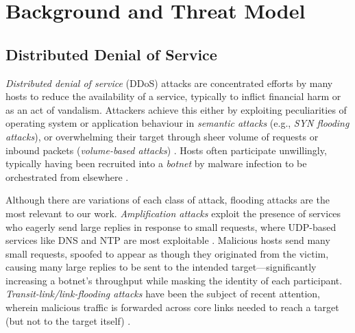 \documentclass[10pt, times, comsoc]{IEEEtran}
\begin{document}
\section{Background and Threat Model}

\subsection{Distributed Denial of Service}


\emph{Distributed denial of service} (DDoS) attacks are concentrated efforts by many hosts to reduce the availability of a service, typically to inflict financial harm or as an act of vandalism.
Attackers achieve this either by exploiting peculiarities of operating system or application behaviour in \emph{semantic attacks} (e.g., \emph{SYN flooding attacks}), or overwhelming their target through sheer volume of requests or inbound packets (\emph{volume-based attacks}) \cite{DBLP:conf/imc/JonkerKKRSD17}.
Hosts often participate unwillingly, typically having been recruited into a \emph{botnet} by malware infection to be orchestrated from elsewhere \cite{DBLP:conf/uss/AntonakakisABBB17}.

Although there are variations of each class of attack, flooding attacks are the most relevant to our work.
\emph{Amplification attacks} exploit the presence of services who eagerly send large replies in response to small requests, where UDP-based services like DNS and NTP are most exploitable \cite{DBLP:conf/ndss/Rossow14, DBLP:conf/uss/KuhrerHRH14}.
Malicious hosts send many small requests, spoofed to appear as though they originated from the victim, causing many large replies to be sent to the intended target---significantly increasing a botnet's throughput while masking the identity of each participant.
\emph{Transit-link/link-flooding attacks} have been the subject of recent attention, wherein malicious traffic is forwarded across core links needed to reach a target (but not to the target itself) \cite{DBLP:conf/sp/KangLG13, DBLP:conf/esorics/StuderP09}.
\end{document}
